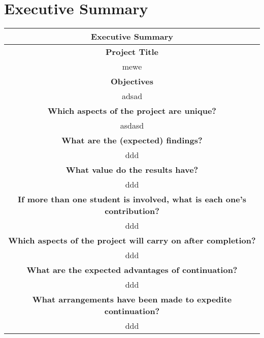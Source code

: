 \begin{abstract}[english]%
This report presents the design, implementation, and testing of a feedback control system for a robotic gymnast. Feedback control systems were designed to swing up and balance an under-actuated robotic gymnast system. A physical system, consisting of mechanical and electronic hardware, was designed and constructed, and the feedback controllers were implemented in software. The feedback control system was verified both in simulation and on the physical system..
\end{abstract}


\begin{abstract}[afrikaans]%
In die projek word die swaaiende en balanseering beheerwette vir 'n robotiese gimnas genavors, ontwerp en getoets op 'n fisiese model. Die eletroniese, meganiese en sagteware ontwerpe word bespreek om ten einde te wys hoe die fisiese model, beheerders en so voort geimplementeer en getoets is.
\end{abstract}

\chapter{Executive Summary}
\begin{table}[!h]
	\centering
	\begin{tabular}{|c|}
		\hline
		\textbf{Executive Summary} \\
		\hline
		\hline
		\textbf{Project Title} \\
		\hline 
		mewe \\
		\hline
		\textbf{Objectives} \\
		\hline 
		adsad \\
		\hline
		\textbf{Which aspects of the project are unique?} \\
		\hline
		asdasd \\
		\hline
		\textbf{What are the (expected) findings?} \\
		\hline
		ddd \\
		\hline 
		\textbf{What value do the results have?} \\
		\hline
		ddd \\
		\hline 
		\textbf{If more than one student is involved, what is each one's contribution?} \\
		\hline 
		ddd \\
		\hline 
		\textbf{Which aspects of the project will carry on after completion?} \\
		\hline
		ddd \\
		\hline 
		\textbf{What are the expected advantages of continuation?} \\
		\hline 
		ddd \\
		\hline 
		\textbf{What arrangements have been made to expedite continuation?} \\
		\hline 
		ddd \\
		\hline
		
		
		
		
		
	\end{tabular}
\end{table}


